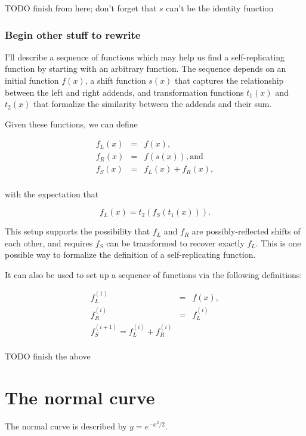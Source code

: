 \documentclass[]{article}
\begin{document}
TODO finish from here; don't forget that \(s\) can't be the identity
function

\subsubsection{Begin other stuff to
rewrite}\label{begin-other-stuff-to-rewrite}

I'll describe a sequence of functions which may help us find a
self-replicating function by starting with an arbitrary function. The
sequence depends on an initial function \(f(x)\), a shift function
\(s(x)\) that captures the relationship between the left and right
addends, and transformation functions \(t_1(x)\) and \(t_2(x)\) that
formalize the similarity between the addends and their sum.

Given these functions, we can define

\[\begin{array}{rcl}
  f_L(x) & = & f(x), \\
  f_R(x) & = & f(s(x)), \text{and} \\
  f_S(x) & = & f_L(x) + f_R(x), \\
\end{array}\]

with the expectation that

\[f_L(x) = t_2(f_S(t_1(x))).\]

This setup supports the possibility that \(f_L\) and \(f_R\) are
possibly-reflected shifts of each other, and requires \(f_S\) can be
transformed to recover exactly \(f_L\). This is one possible way to
formalize the definition of a self-replicating function.

It can also be used to set up a sequence of functions via the following
definitions:

\[\begin{array}{rcl}
  f^{(1)}_L & = & f(x), \\
  f^{(i)}_R & = & f^{(i)}_L \\
  f^{(i+1)}_S = f^{(i)}_L + f^{(i)}_R \\
\end{array}\]

TODO finish the above

\section{The normal curve}\label{the-normal-curve}

The normal curve is described by \(y = e^{-x^2/2}\).
\end{document}
